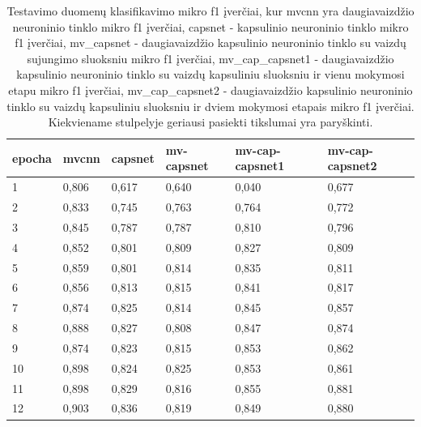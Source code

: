 \begin{table}[]
	\caption{
		Testavimo duomenų klasifikavimo mikro f1 įverčiai, kur mvcnn yra daugiavaizdžio neuroninio tinklo mikro f1 įverčiai, capsnet - kapsulinio neuroninio tinklo mikro f1 įverčiai, mv\_capsnet - daugiavaizdžio kapsulinio neuroninio tinklo su vaizdų sujungimo sluoksniu mikro f1 įverčiai, mv\_cap\_capsnet1 - daugiavaizdžio kapsulinio neuroninio tinklo su vaizdų kapsuliniu sluoksniu ir vienu mokymosi etapu mikro f1 įverčiai, mv\_cap\_capsnet2 - daugiavaizdžio kapsulinio neuroninio tinklo su vaizdų kapsuliniu sluoksniu ir dviem mokymosi etapais mikro f1 įverčiai. Kiekviename stulpelyje geriausi pasiekti tikslumai yra paryškinti.
	}
	\begin{tabular}{l|l|l|l|l|l}
		epocha & mvcnn & capsnet & mv-capsnet & mv-cap-capsnet1 & mv-cap-capsnet2 \\
		\hline
		1 & 0,806 &   0,617 &      0,640 &           0,040 &           0,677 \\
		2 & 0,833 &   0,745 &      0,763 &           0,764 &           0,772 \\
		3 & 0,845 &   0,787 &      0,787 &           0,810 &           0,796 \\
		4 & 0,852 &   0,801 &      0,809 &           0,827 &           0,809 \\
		5 & 0,859 &   0,801 &      0,814 &           0,835 &           0,811 \\
		6 & 0,856 &   0,813 &      0,815 &           0,841 &           0,817 \\
		7 & 0,874 &   0,825 &      0,814 &           0,845 &           0,857 \\
		8 & 0,888 &   0,827 &      0,808 &           0,847 &           0,874 \\
		9 & 0,874 &   0,823 &      0,815 &           0,853 &           0,862 \\
		10 & 0,898 &   0,824 &      0,825 &           0,853 &           0,861 \\
		11 & 0,898 &   0,829 &      0,816 &           0,855 &           0,881 \\
		12 & 0,903 &   0,836 &      0,819 &           0,849 &           0,880 \\
	\end{tabular}
	\label{tbl:micro_f1}
\end{table}

